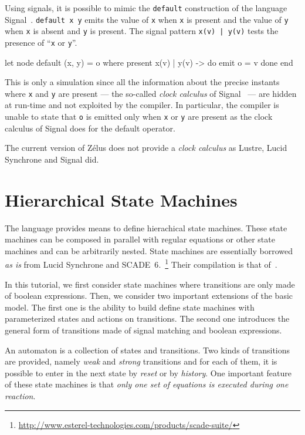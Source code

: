 \documentclass[11pt,titlepage,twoside]{report}
\newcommand{\zelus}{{\sf Z\'elus}}
\newcommand{\lustre}{{\sf Lustre}}
\newcommand{\lucy}{{\sf Lucid Synchrone}}
\newcommand{\scadesix}{{\sf SCADE~6}}
\newcommand{\signal}{{\sf Signal}}
\newcommand{\Remark}{\medskip\noindent{\bf Remark: }}
\begin{document}
\Remark Using signals, it is possible
to mimic the
\verb-default- construction of the language
\signal~\cite{signal:scp91}. \verb-default x y- emits the value of \verb-x- when \verb-x-
is present and the value of \verb-y- when \verb-x- is absent and
\verb-y- is present. The signal pattern \verb+x(v) | y(v)+ tests the
presence of ``\verb-x- or \verb-y-''.
\begin{runverbatim}
let node default (x, y) = o where
  present
    x(v) | y(v) -> do emit o = v done
  end
\end{runverbatim}
This is only a simulation since all the information about the precise
instants where \verb-x- and \verb-y- are present --- the so-called
\emph{clock calculus} of \signal~\cite{signal:scp91} --- are hidden at
run-time and not exploited by the compiler. In particular, the
compiler is unable to state that \verb-o- is emitted only when
\verb-x- or \verb-y- are present as the clock calculus of
\signal{} does for the default operator.

The current version of \zelus{} does not provide a \emph{clock calculus} as
\lustre, \lucy{} and \signal{} did.

\section{Hierarchical State Machines}
The language provides means to define hierachical state
machines. These state machines can be composed in parallel with
regular equations or other state machines and can be arbitrarily
nested. State machines are essentially borrowed \emph{as is} from \lucy{} and 
\scadesix.~\footnote{\url{http://www.esterel-technologies.com/products/scade-suite/}}
Their compilation is that of~\cite{lucy:emsoft05b}.

In this tutorial, we first consider state machines where transitions
are only made of boolean expressions. Then, we consider two important
extensions of the basic model. The first one is the ability to build
define state machines with parameterized states and actions on
transitions. The second one introduces the general form of transitions
made of signal matching and boolean expressions.

An automaton is a collection of states and transitions. Two kinds of
transitions are provided, namely {\em weak} and {\em strong}
transitions and for each of them, it is possible to enter in the next
state by {\em reset} or by {\em history}. One important feature of
these state machines is that {\em only one set of equations is
  executed during one reaction}.
\end{document}

